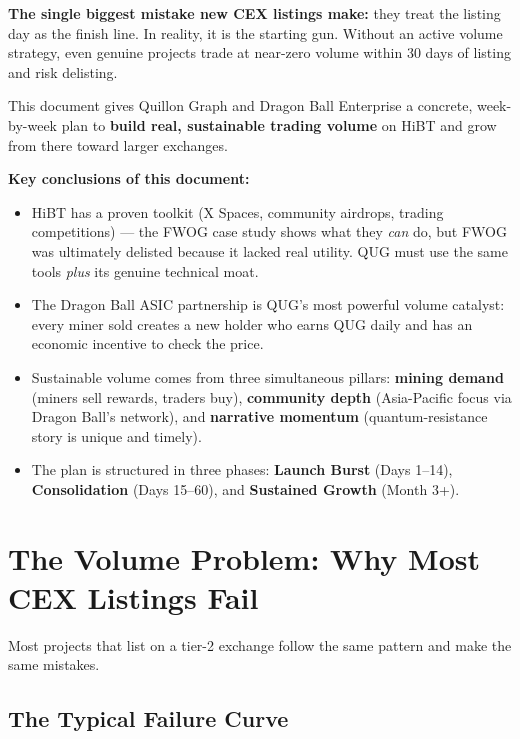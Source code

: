 \documentclass[11pt,a4paper]{article}
\begin{document}
\begin{greenbox}
\textbf{The single biggest mistake new CEX listings make:} they treat the listing day as the finish line. In reality, it is the starting gun. Without an active volume strategy, even genuine projects trade at near-zero volume within 30 days of listing and risk delisting.

This document gives Quillon Graph and Dragon Ball Enterprise a concrete, week-by-week plan to \textbf{build real, sustainable trading volume} on HiBT and grow from there toward larger exchanges.
\end{greenbox}

\medskip

\textbf{Key conclusions of this document:}

\begin{itemize}[leftmargin=1.5em]
  \item HiBT has a proven toolkit (X Spaces, community airdrops, trading competitions) — the FWOG case study shows what they \emph{can} do, but FWOG was ultimately delisted because it lacked real utility. QUG must use the same tools \emph{plus} its genuine technical moat.
  \item The Dragon Ball ASIC partnership is QUG's most powerful volume catalyst: every miner sold creates a new holder who earns QUG daily and has an economic incentive to check the price.
  \item Sustainable volume comes from three simultaneous pillars: \textbf{mining demand} (miners sell rewards, traders buy), \textbf{community depth} (Asia-Pacific focus via Dragon Ball's network), and \textbf{narrative momentum} (quantum-resistance story is unique and timely).
  \item The plan is structured in three phases: \textbf{Launch Burst} (Days 1--14), \textbf{Consolidation} (Days 15--60), and \textbf{Sustained Growth} (Month 3+).
\end{itemize}

\section{The Volume Problem: Why Most CEX Listings Fail}

Most projects that list on a tier-2 exchange follow the same pattern and make the same mistakes.

\subsection{The Typical Failure Curve}
\end{document}

